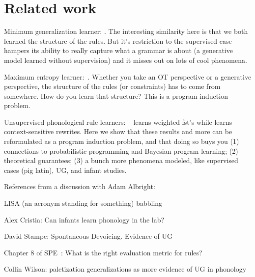 \documentclass{article}
\begin{document}


\section{Related work}

Minimum generalization learner: \cite{Albright03rulesvs}. The interesting similarity here is that we both learned the structure of the rules. But it's restriction to the supervised case hampers its ability to really capture what a grammar is about (a generative model learned without supervision) and it misses out on lots of cool phenomena.

Maximum entropy learner:~\cite{goldwater2003learning}. Whether you take an OT perspective or a generative perspective, the structure of the rules (or constraints) has to come from somewhere. How do you learn that structure? This is a program induction problem.

Unsupervised phonological rule learners:
~\cite{cotterell-peng-eisner-2015} learns weighted fst's while
\cite{rulebased} learns context-sensitive rewrites. Here we show that
these results and more can be reformulated as a program induction
problem, and that doing so buys you (1) connections to probabilistic
programming and Bayesian program learning; (2) theoretical guarantees;
(3) a bunch more phenomena modeled, like supervised cases (pig latin),
UG, and infant studies.

References from a discussion with Adam Albright:

LISA (an acronym standing for something) babbling

Alex Cristia: Can infants learn phonology in the lab?

David Stampe: Spontaneous Devoicing. Evidence of UG

Chapter 8 of SPE~\cite{chomsky1968sound}: What is the right evaluation metric for rules?

Collin Wilson: paletization generalizations as more evidence of UG in phonology
\end{document}
